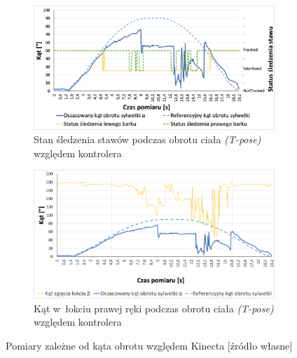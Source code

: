 \begin{savenotes}
	\begin{figure}[!htb]
		\captionsetup{singlelinecheck=off}
		\centering
		\begin{subfigure}[b]{0.9\textwidth}
			\centering
			\includegraphics[width=\linewidth]{images/kinectRotation.png}	
			\caption{Stan śledzenia stawów podczas obrotu ciała \emph{(T-pose)} względem kontrolera}
			\label{fig:characteristics:kinect:bodyRotationChart}
		\end{subfigure}
		
		\hfill																																																
		\begin{subfigure}[b]{0.9\textwidth}
			\centering
			\includegraphics[width=\linewidth]{images/kinectRightHandElbowAngle.png}		
			\caption{Kąt w~łokciu prawej ręki podczas obrotu ciała \emph{(T-pose)} względem kontrolera}
			\label{fig:characteristics:kinect:kinectRightHandElbowAngle}
		\end{subfigure}				
		\caption{Pomiary zależne od kąta obrotu względem Kinecta [źródło własne]}
	\end{figure}
\end{savenotes}
																																					
